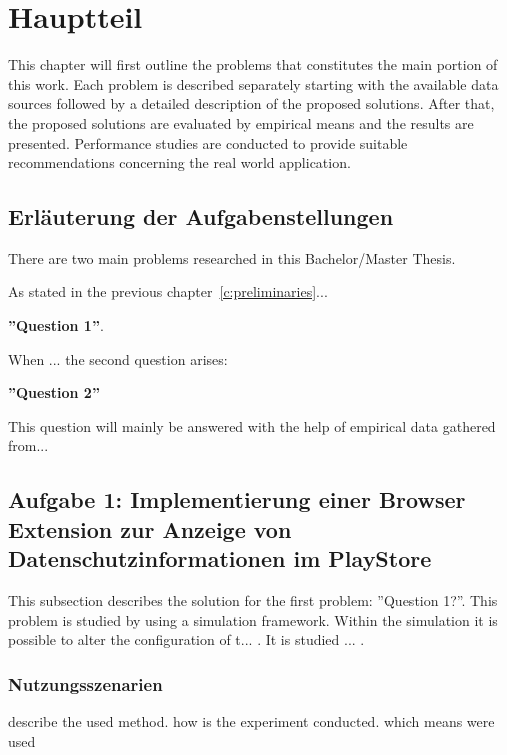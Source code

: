 \chapter{Hauptteil}
\label{c:mainpart1}

This chapter will first outline the problems that constitutes the main portion of this work. Each problem is described separately starting with the available data sources followed by a detailed description of the proposed solutions. After that, the proposed solutions are evaluated by empirical means and the results are presented. Performance studies are conducted to provide suitable recommendations concerning the real world application.



\section{Erläuterung der Aufgabenstellungen}
\label{s:prob_describtion}

There are two main problems researched in this Bachelor/Master Thesis.

As stated in the previous chapter~\ref{c:preliminaries}...

\textbf{''Question 1''}. 

When ... the second question arises: 

\textbf{''Question 2''}

This question will mainly be answered with the help of empirical data gathered from...


\section{Aufgabe 1: Implementierung einer Browser Extension zur Anzeige von Datenschutzinformationen im PlayStore}
\label{s:solution_prob_1}

This subsection describes the solution for the first problem: ''Question 1?''. This problem is studied by using a simulation framework. Within the simulation it is possible to alter the configuration of t... . It is studied ... .



\subsection{Nutzungsszenarien}
\label{ss:method}

describe the used method. how is the experiment conducted. which means were used

